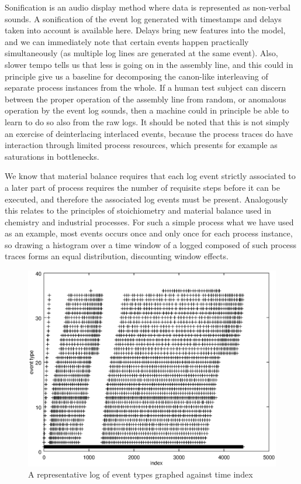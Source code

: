 \documentclass[journal]{IEEEtran}
\begin{document}
Sonification is an audio display method where data is represented as non-verbal sounds. A sonification of the event log generated with timestamps and delays taken into account
is available here\cite{PHONOZATION}. Delays bring new features into the model, and
we can immediately note that certain events happen practically simultaneously (as multiple log lines are generated at the same event). Also, slower tempo tells us that less is
going on in the assembly line, and this could in principle give us a baseline for decomposing the canon-like interleaving of separate process instances from the whole.
If a human test subject can discern between the proper operation of the assembly line from random, or anomalous operation by the event log sounds,
then a machine could in principle be able to learn to do so also from the raw logs. It should be noted that this is not simply an exercise of deinterlacing interlaced events, because
the process traces do have interaction through limited process resources, which presents for example as saturations in bottlenecks.

We know that material balance requires that each log event strictly associated to a later part of process requires the number of requisite steps before it can be executed, and
therefore the associated log events must be present. Analogously this relates to the principles of stoichiometry and material balance used in chemistry and industrial processes.
For such a simple process what we have used as an example, most events occurs once and only once for each process instance, so drawing a histogram over a time window of a logged
composed of such process traces forms an equal distribution, discounting window effects.

\begin{figure}[tb]
 \centering
 \includegraphics[width=8 cm,keepaspectratio=true]{./representative_log.eps}
 \caption{A representative log of event types graphed against time index}
 \label{figure:events}
\end{figure}
\end{document}
